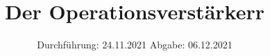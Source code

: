

\subject{V61}
\title{Der Operationsverstärkerr}
\date{%
  Durchführung: 24.11.2021
  \hspace{3em}
  Abgabe: 06.12.2021
}



\maketitle
\thispagestyle{empty}
\tableofcontents
\newpage







\printbibliography{}


